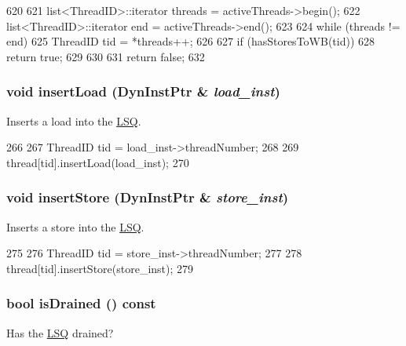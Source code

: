 \begin{DoxyCode}
620 {
621     list<ThreadID>::iterator threads = activeThreads->begin();
622     list<ThreadID>::iterator end = activeThreads->end();
623 
624     while (threads != end) {
625         ThreadID tid = *threads++;
626 
627         if (hasStoresToWB(tid))
628             return true;
629     }
630 
631     return false;
632 }
\end{DoxyCode}
\hypertarget{classLSQ_ad22b3ecafed2bcd9c59fcab049a1cb98}{
\subsubsection[{insertLoad}]{\setlength{\rightskip}{0pt plus 5cm}void insertLoad ({\bf DynInstPtr} \& {\em load\_\-inst})}}
\label{classLSQ_ad22b3ecafed2bcd9c59fcab049a1cb98}
Inserts a load into the \hyperlink{classLSQ}{LSQ}. 


\begin{DoxyCode}
266 {
267     ThreadID tid = load_inst->threadNumber;
268 
269     thread[tid].insertLoad(load_inst);
270 }
\end{DoxyCode}
\hypertarget{classLSQ_a6a4b4e51bfff3639932ebaba45e8a282}{
\subsubsection[{insertStore}]{\setlength{\rightskip}{0pt plus 5cm}void insertStore ({\bf DynInstPtr} \& {\em store\_\-inst})}}
\label{classLSQ_a6a4b4e51bfff3639932ebaba45e8a282}
Inserts a store into the \hyperlink{classLSQ}{LSQ}. 


\begin{DoxyCode}
275 {
276     ThreadID tid = store_inst->threadNumber;
277 
278     thread[tid].insertStore(store_inst);
279 }
\end{DoxyCode}
\hypertarget{classLSQ_adf5473c18a3d7c1e88c4a2072bce5526}{
\subsubsection[{isDrained}]{\setlength{\rightskip}{0pt plus 5cm}bool isDrained () const}}
\label{classLSQ_adf5473c18a3d7c1e88c4a2072bce5526}
Has the \hyperlink{classLSQ}{LSQ} drained? 


